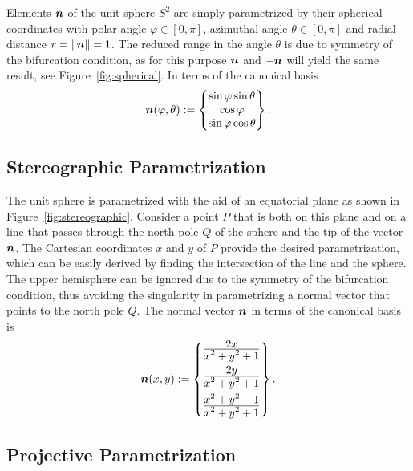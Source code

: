 \documentclass[12pt]{article}
\numberwithin{equation}{section}
\begin{document}
Elements ${\boldsymbol{n}}$ of the unit sphere $S^2$ are simply parametrized by
their spherical coordinates with polar angle $\varphi \in [0, \pi]$,
azimuthal angle $\theta \in [0, \pi]$ and radial distance $r = \|
{\boldsymbol{n}} \| = 1$. The reduced range in the angle $\theta$ is due to
symmetry of the bifurcation condition, as for this purpose ${\boldsymbol{n}}$ and
$- {\boldsymbol{n}}$ will yield the same result, see Figure~\ref{fig:spherical}. In
terms of the canonical basis
\begin{equation}
  {\boldsymbol{n}}(\varphi, \theta)
  :=
  \begin{Bmatrix}
    \sin\varphi \sin\theta
    \\
    \cos\varphi
    \\
    \sin\varphi \cos\theta
  \end{Bmatrix}.
\end{equation}

\subsection{Stereographic Parametrization}
\label{subsec:stereographic}

The unit sphere is parametrized with the aid of an equatorial plane as
shown in Figure~\ref{fig:stereographic}.  Consider a point $P$ that is
both on this plane and on a line that passes through the north pole
$Q$ of the sphere and the tip of the vector ${\boldsymbol{n}}$. The Cartesian
coordinates $x$ and $y$ of $P$ provide the desired parametrization,
which can be easily derived by finding the intersection of the line
and the sphere. The upper hemisphere can be ignored due to the
symmetry of the bifurcation condition, thus avoiding the singularity
in parametrizing a normal vector that points to the north pole
$Q$. The normal vector ${\boldsymbol{n}}$ in terms of the canonical basis is
\begin{equation}
  {\boldsymbol{n}}(x,y)
  := 
  \begin{Bmatrix}
    \frac{\displaystyle 2x}{\displaystyle x^2+y^2+1}
    \\[0.9em]
    \frac{\displaystyle 2y}{\displaystyle x^2+y^2+1}
    \\[0.9em]
    \frac{\displaystyle x^2+y^2-1}{\displaystyle x^2+y^2+1}
  \end{Bmatrix}.
\end{equation}

\subsection{Projective Parametrization}
\label{subsec:projective}
\end{document}
